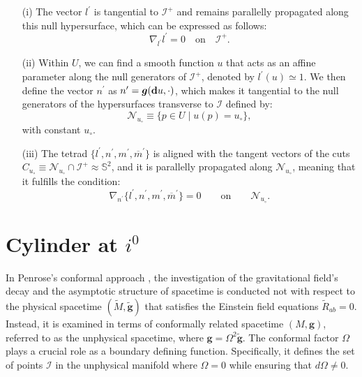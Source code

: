 \begin{itemize}
  \item[(i)] The vector $l^{\prime}$ is tangential to $\mathscr{I}^{+}$ and remains parallelly propagated along this null hypersurface, which can be expressed as follows:
   \begin{equation*}
   \nabla_{l^{\prime}} l^{\prime} = 0 \quad \text{on} \quad \mathscr{I}^{+}.
   \end{equation*}
  \item[(ii)] Within $U$, we can find a smooth function $u$ that acts as an affine parameter along the null generators of $\mathscr{I}^{+}$, denoted by $l^{\prime}(u) \simeq 1$. We then define the vector $n^{\prime}$ as $n^{\prime}=\boldsymbol{g}(\mbox{\textbf{d}}u, \cdot )$, which makes it tangential to the null generators of the hypersurfaces transverse to $\mathscr{I}$ defined by:
  \begin{equation*}
  \mathcal{N}_{u_{\circ}}\equiv \{ p \in U \;| \; u(p)=u_{\circ}\},
  \end{equation*}
   with constant $u_{\circ}$.
  \item[(iii)] The tetrad $\{l^{\prime}, n^{\prime}, m^{\prime}, \overline{m}^{\prime}\}$ is aligned with the tangent vectors of the cuts ${C}_{u_{\circ}}\equiv \mathcal{N}_{u_{\circ}}\cap \mathscr{I}^{+} \approx \mathbb{S}^2$, and it is parallelly propagated along $\mathcal{N}_{u_{\circ}}$, meaning that it fulfills the condition:
  \begin{equation*}
  \nabla_{n^{\prime}}\{l^{\prime}, n^{\prime}, m^{\prime}, \overline{m}^{\prime}\}=0 \qquad \text{on} \qquad
  \mathcal{N}_{u_{\circ}}.
  \end{equation*}
  \end{itemize}

\chapter{Cylinder at $i^0$}
\label{chapter:cylinder}

In Penrose's conformal approach \cite{Pen63}, the investigation of the gravitational field's decay and the asymptotic structure of spacetime is conducted not with respect to the physical spacetime $(\tilde{{M}}, \tilde{\boldsymbol{g}})$ that satisfies the Einstein field equations $\tilde{R}_{a b}=0$. Instead, it is examined in terms of conformally related spacetime $({M}, \boldsymbol{g})$, referred to as the unphysical spacetime, where $\boldsymbol{g}=\Omega^2 \tilde{\boldsymbol{g}}$. The conformal factor $\Omega$ plays a crucial role as a boundary defining function. Specifically, it defines the set of points $\mathscr{I}$ in the unphysical manifold where $\Omega = 0$ while ensuring that $d\Omega \neq 0$. 

